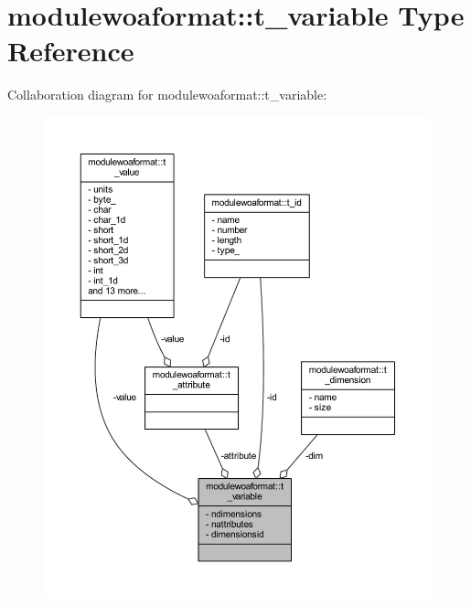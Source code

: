 \hypertarget{structmodulewoaformat_1_1t__variable}{}\section{modulewoaformat\+:\+:t\+\_\+variable Type Reference}
\label{structmodulewoaformat_1_1t__variable}


Collaboration diagram for modulewoaformat\+:\+:t\+\_\+variable\+:\nopagebreak
\begin{figure}[H]
\begin{center}
\leavevmode
\includegraphics[width=350pt]{structmodulewoaformat_1_1t__variable__coll__graph}
\end{center}
\end{figure}
